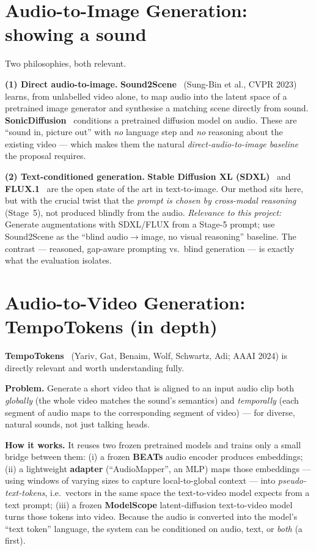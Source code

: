 \documentclass[11pt,a4paper]{article}
\newcommand{\rel}[1]{\smallskip\noindent\textit{Relevance to this project:} #1}
\begin{document}
\section{Audio-to-Image Generation: showing a sound}
Two philosophies, both relevant.

\textbf{(1) Direct audio-to-image.} \textbf{Sound2Scene}~\cite{sound2scene} (Sung-Bin et al., CVPR
2023) learns, from unlabelled video alone, to map audio into the latent space of a pretrained image
generator and synthesise a matching scene directly from sound.
\textbf{SonicDiffusion}~\cite{sonicdiffusion} conditions a pretrained diffusion model on audio. These
are ``sound in, picture out'' with \emph{no} language step and \emph{no} reasoning about the existing
video --- which makes them the natural \emph{direct-audio-to-image baseline} the proposal requires.

\textbf{(2) Text-conditioned generation.} \textbf{Stable Diffusion XL (SDXL)}~\cite{sdxl} and
\textbf{FLUX.1}~\cite{flux} are the open state of the art in text-to-image. Our method sits here, but
with the crucial twist that the \emph{prompt is chosen by cross-modal reasoning} (Stage~5), not
produced blindly from the audio.
\rel{Generate augmentations with SDXL/FLUX from a Stage-5 prompt; use Sound2Scene as the
``blind audio$\to$image, no visual reasoning'' baseline. The contrast --- reasoned, gap-aware prompting
vs.\ blind generation --- is exactly what the evaluation isolates.}

\section{Audio-to-Video Generation: TempoTokens (in depth)}
\textbf{TempoTokens}~\cite{tempotokens} (Yariv, Gat, Benaim, Wolf, Schwartz, Adi; AAAI 2024) is
directly relevant and worth understanding fully.

\textbf{Problem.} Generate a short video that is aligned to an input audio clip both \emph{globally}
(the whole video matches the sound's semantics) and \emph{temporally} (each segment of audio maps to
the corresponding segment of video) --- for diverse, natural sounds, not just talking heads.

\textbf{How it works.} It reuses two frozen pretrained models and trains only a small bridge between
them: (i) a frozen \textbf{BEATs} audio encoder produces embeddings; (ii) a lightweight
\textbf{adapter} (``AudioMapper'', an MLP) maps those embeddings --- using windows of varying sizes to
capture local-to-global context --- into \emph{pseudo-text-tokens}, i.e.\ vectors in the same space the
text-to-video model expects from a text prompt; (iii) a frozen \textbf{ModelScope} latent-diffusion
text-to-video model turns those tokens into video. Because the audio is converted into the model's
``text token'' language, the system can be conditioned on audio, text, or \emph{both} (a first).
\end{document}
